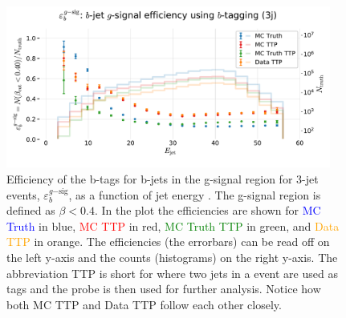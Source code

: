 \begin{figure}
  \centerfloat
  \includegraphics[width=0.95\textwidth, trim=0 0 0 40, clip]{figures/quarks/eff_b_gsig-down_sample=1.00-ML_vars=vertex-selection=b-ejet_min=4-n_iter_RS_lgb=99-n_iter_RS_xgb=9-cdot_cut=0.90-version=19.pdf}
  \caption[b-Tagging Efficiency $\varepsilon_b^{g\mathrm{-sig}}$ as a function of jet energy]
          {Efficiency of the b-tags for b-jets in the g-signal region for 3-jet events, $\varepsilon_b^{g\mathrm{-sig}}$, as a function of jet energy . The g-signal region is defined as $\beta < 0.4$. In the plot the efficiencies are shown for \textcolor{blue}{MC Truth} in blue, \textcolor{red}{MC TTP} in red, \textcolor{green}{MC Truth TTP} in green, and \textcolor{orange}{Data TTP} in orange. The efficiencies (the errorbars) can be read off on the left y-axis and the counts (histograms) on the right y-axis. The abbreviation TTP is short for  where two jets in a event are used as tags and the probe is then used for further analysis. Notice how both MC TTP and Data TTP follow each other closely.  
          } 
  \label{fig:q:effiency_btag_bjet_gsig}
\end{figure}


